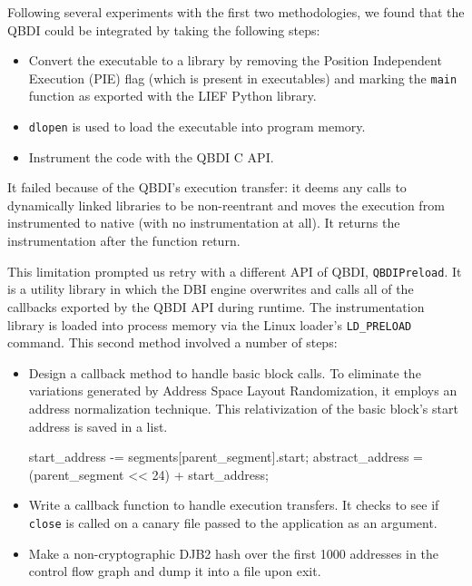 \documentclass[../main.tex]{subfiles}
\begin{document}
Following several experiments with the first two methodologies, we found
that the QBDI could be integrated by taking the following steps:

\begin{itemize}
\tightlist
\item
  Convert the executable to a library by removing the Position Independent Execution (PIE) flag (which is
  present in executables) and marking the \texttt{main} function as
  exported with the LIEF Python library.
\item
  \texttt{dlopen} is used to load the executable into program memory.
\item
  Instrument the code with the QBDI C API.
\end{itemize}

It failed because of the QBDI's execution transfer: it deems any calls
to dynamically linked libraries to be non-reentrant and moves the
execution from instrumented to native (with no instrumentation at all).
It returns the instrumentation after the function return.

This limitation prompted us retry with a different API of QBDI,
\texttt{QBDIPreload}. It is a utility library in which the DBI engine
overwrites and calls all of the callbacks exported by the QBDI API
during runtime. The instrumentation library is loaded into process
memory via the Linux loader's \texttt{LD\_PRELOAD} command. This second
method involved a number of steps:

\begin{itemize}
\item
  Design a callback method to handle basic block calls. To eliminate the
  variations generated by Address Space Layout Randomization, it employs
  an address normalization technique. This relativization of the basic
  block's start address is saved in a list.

\begin{captioned_verbatim}[title={The Address Normalization Technique}]
start_address -= segments[parent_segment].start;
abstract_address = (parent_segment << 24) + start_address;
\end{captioned_verbatim}

\item
  Write a callback function to handle execution transfers. It checks to
  see if \texttt{close} is called on a canary file passed to the
  application as an argument.
\item
  Make a non-cryptographic DJB2 hash over the first 1000 addresses in
  the control flow graph and dump it into a file upon exit.
\end{itemize}
\end{document}
